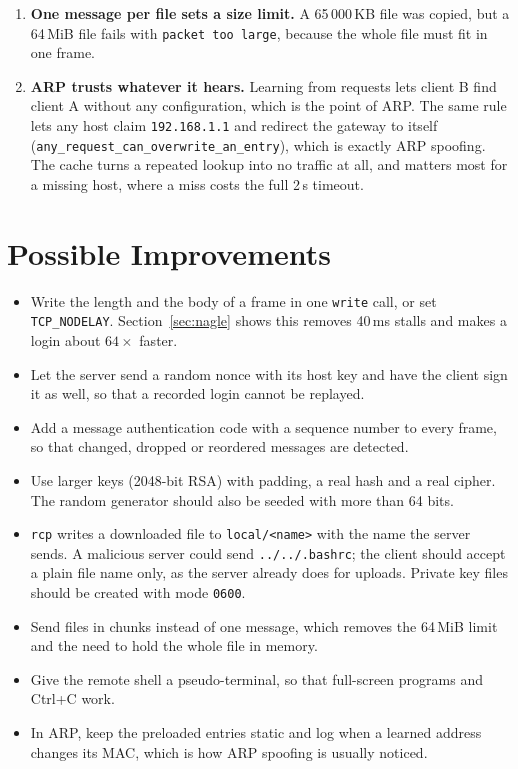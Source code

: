\documentclass[11pt,a4paper]{article}
\begin{document}
\begin{enumerate}
\item \textbf{One message per file sets a size limit.} A 65\,000\,KB file was
  copied, but a 64\,MiB file fails with \texttt{packet too large}, because the
  whole file must fit in one frame.

\item \textbf{ARP trusts whatever it hears.} Learning from requests lets client
  B find client A without any configuration, which is the point of ARP. The same
  rule lets any host claim \texttt{192.168.1.1} and redirect the gateway to
  itself (\texttt{any\_request\_can\_overwrite\_an\_entry}), which is exactly
  ARP spoofing. The cache turns a repeated lookup into no traffic at all, and
  matters most for a missing host, where a miss costs the full 2\,s timeout.
\end{enumerate}

\section{Possible Improvements}

\begin{itemize}
\item Write the length and the body of a frame in one \texttt{write} call, or
  set \texttt{TCP\_NODELAY}. Section~\ref{sec:nagle} shows this removes 40\,ms stalls and
  makes a login about $64\times$ faster.
\item Let the server send a random nonce with its host key and have the client
  sign it as well, so that a recorded login cannot be replayed.
\item Add a message authentication code with a sequence number to every frame,
  so that changed, dropped or reordered messages are detected.
\item Use larger keys (2048-bit RSA) with padding, a real hash and a real
  cipher. The random generator should also be seeded with more than 64 bits.
\item \texttt{rcp} writes a downloaded file to \texttt{local/<name>} with the name
  the server sends. A malicious server could send \texttt{../../.bashrc}; the
  client should accept a plain file name only, as the server already does for
  uploads. Private key files should be created with mode \texttt{0600}.
\item Send files in chunks instead of one message, which removes the 64\,MiB
  limit and the need to hold the whole file in memory.
\item Give the remote shell a pseudo-terminal, so that full-screen programs and
  Ctrl+C work.
\item In ARP, keep the preloaded entries static and log when a learned address
  changes its MAC, which is how ARP spoofing is usually noticed.
\end{itemize}
\end{document}
